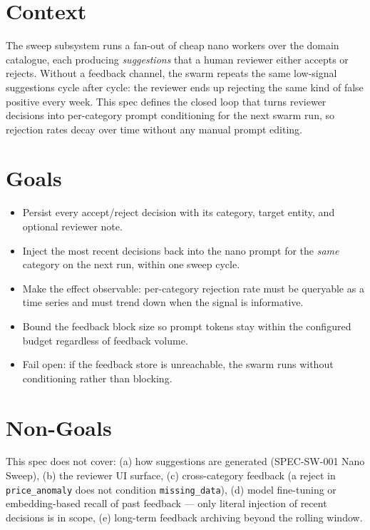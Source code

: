 



\makespecheader

\section{Context}
The sweep subsystem runs a fan-out of cheap nano workers over the domain catalogue, each producing
\emph{suggestions} that a human reviewer either accepts or rejects. Without a feedback channel, the
swarm repeats the same low-signal suggestions cycle after cycle: the reviewer ends up rejecting the
same kind of false positive every week. This spec defines the closed loop that turns reviewer
decisions into per-category prompt conditioning for the next swarm run, so rejection rates decay
over time without any manual prompt editing.

\section{Goals}
\begin{itemize}[leftmargin=1.2em]
  \item Persist every accept/reject decision with its category, target entity, and optional reviewer note.
  \item Inject the most recent decisions back into the nano prompt for the \emph{same} category on the next run, within one sweep cycle.
  \item Make the effect observable: per-category rejection rate must be queryable as a time series and must trend down when the signal is informative.
  \item Bound the feedback block size so prompt tokens stay within the configured budget regardless of feedback volume.
  \item Fail open: if the feedback store is unreachable, the swarm runs without conditioning rather than blocking.
\end{itemize}

\section{Non-Goals}
\begin{nongoal}
This spec does not cover: (a) how suggestions are generated (SPEC-SW-001 Nano Sweep), (b) the
reviewer UI surface, (c) cross-category feedback (a reject in \texttt{price\_anomaly} does not
condition \texttt{missing\_data}), (d) model fine-tuning or embedding-based recall of past
feedback --- only literal injection of recent decisions is in scope, (e) long-term feedback
archiving beyond the rolling window.
\end{nongoal}

